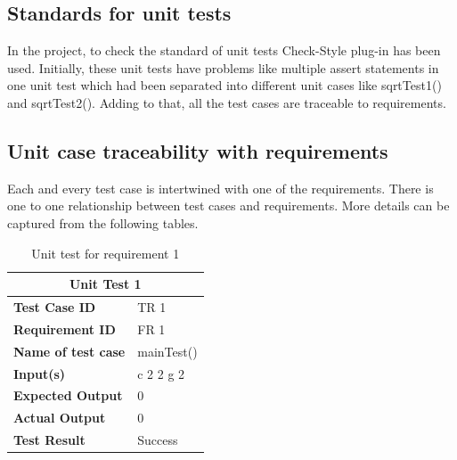 \documentclass{scrartcl}
\begin{document}
\subsection{Standards for unit tests}

\begin{spacing}{1.5}
\begin{Large}
In the project, to check the standard of unit tests Check-Style plug-in has been used. Initially, these unit tests have problems like multiple assert statements in one unit test which had been separated into different unit cases like sqrtTest1() and sqrtTest2(). Adding to that, all the test cases are traceable to requirements. 
\end{Large}
\end{spacing}

\subsection{Unit case traceability with requirements}
\begin{spacing}{1.5}
\begin{Large}
Each and every test case is intertwined with one of the requirements. There is one to one relationship between test cases and requirements. More details can be captured from the following tables.  
\end{Large}
\end{spacing}

\begin{table}[H]
\begin{Large}
\begin{center}
\begin{tabular}{ | m{10em} | m{10em} | } 
  \hline
  \multicolumn{2}{|c|}{\textbf {Unit Test 1}} \\ 
  \hline
  \textbf{Test Case ID}  &  TR 1\\ 
  \hline
  \textbf{Requirement ID} &  FR 1\\
  \hline
  \textbf{Name of test case} & mainTest()\\
  \hline
  \textbf{Input(s) } &  c 2 2 g 2 \\
  \hline
  \textbf{Expected Output } & 0\\
  \hline
  \textbf{Actual Output } & 0\\
  \hline
  \textbf{Test Result } & Success \\
 \hline
\end{tabular}
\caption{Unit test for requirement 1}
\label{table:unit test 1}
\end{center}
\end{Large}
\end{table}
\end{document}
